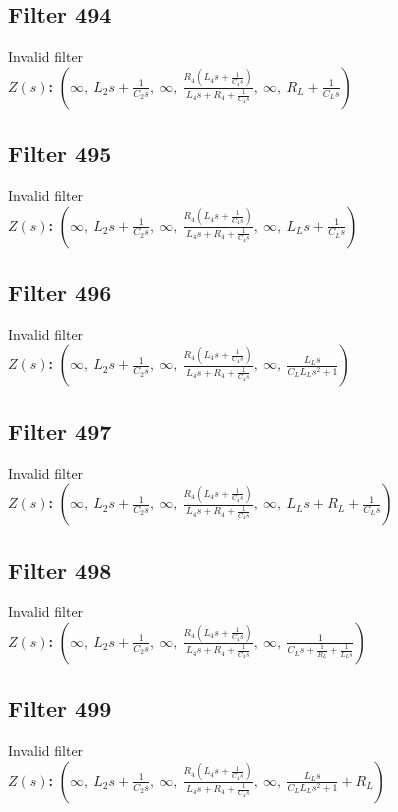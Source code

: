 \documentclass{article}
\begin{document}
\subsection*{Filter 494}
Invalid filter \\ 
\textbf{$Z(s)$:} $\left( \infty, \  L_{2} s + \frac{1}{C_{2} s}, \  \infty, \  \frac{R_{4} \left(L_{4} s + \frac{1}{C_{4} s}\right)}{L_{4} s + R_{4} + \frac{1}{C_{4} s}}, \  \infty, \  R_{L} + \frac{1}{C_{L} s}\right)$ \\ 
\subsection*{Filter 495}
Invalid filter \\ 
\textbf{$Z(s)$:} $\left( \infty, \  L_{2} s + \frac{1}{C_{2} s}, \  \infty, \  \frac{R_{4} \left(L_{4} s + \frac{1}{C_{4} s}\right)}{L_{4} s + R_{4} + \frac{1}{C_{4} s}}, \  \infty, \  L_{L} s + \frac{1}{C_{L} s}\right)$ \\ 
\subsection*{Filter 496}
Invalid filter \\ 
\textbf{$Z(s)$:} $\left( \infty, \  L_{2} s + \frac{1}{C_{2} s}, \  \infty, \  \frac{R_{4} \left(L_{4} s + \frac{1}{C_{4} s}\right)}{L_{4} s + R_{4} + \frac{1}{C_{4} s}}, \  \infty, \  \frac{L_{L} s}{C_{L} L_{L} s^{2} + 1}\right)$ \\ 
\subsection*{Filter 497}
Invalid filter \\ 
\textbf{$Z(s)$:} $\left( \infty, \  L_{2} s + \frac{1}{C_{2} s}, \  \infty, \  \frac{R_{4} \left(L_{4} s + \frac{1}{C_{4} s}\right)}{L_{4} s + R_{4} + \frac{1}{C_{4} s}}, \  \infty, \  L_{L} s + R_{L} + \frac{1}{C_{L} s}\right)$ \\ 
\subsection*{Filter 498}
Invalid filter \\ 
\textbf{$Z(s)$:} $\left( \infty, \  L_{2} s + \frac{1}{C_{2} s}, \  \infty, \  \frac{R_{4} \left(L_{4} s + \frac{1}{C_{4} s}\right)}{L_{4} s + R_{4} + \frac{1}{C_{4} s}}, \  \infty, \  \frac{1}{C_{L} s + \frac{1}{R_{L}} + \frac{1}{L_{L} s}}\right)$ \\ 
\subsection*{Filter 499}
Invalid filter \\ 
\textbf{$Z(s)$:} $\left( \infty, \  L_{2} s + \frac{1}{C_{2} s}, \  \infty, \  \frac{R_{4} \left(L_{4} s + \frac{1}{C_{4} s}\right)}{L_{4} s + R_{4} + \frac{1}{C_{4} s}}, \  \infty, \  \frac{L_{L} s}{C_{L} L_{L} s^{2} + 1} + R_{L}\right)$ \\ 
\end{document}
